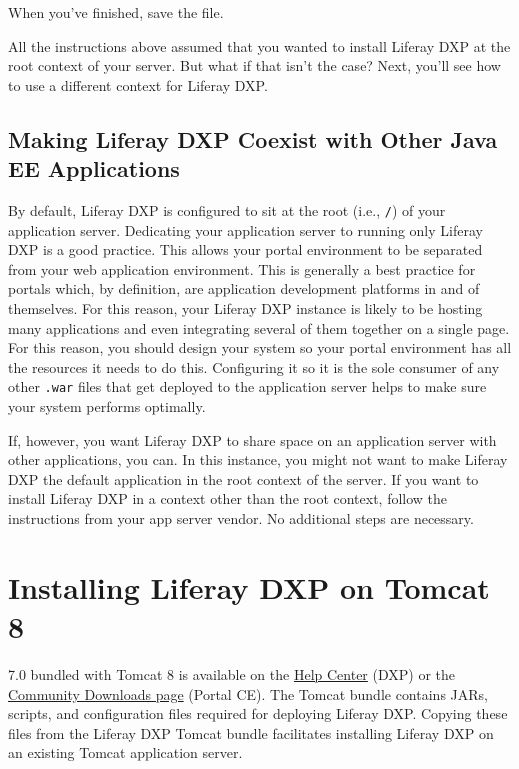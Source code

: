 When you've finished, save the file.

All the instructions above assumed that you wanted to install Liferay
DXP at the root context of your server. But what if that isn't the case?
Next, you'll see how to use a different context for Liferay DXP.

\subsection{Making Liferay DXP Coexist with Other Java EE
Applications}\label{making-liferay-dxp-coexist-with-other-java-ee-applications}

By default, Liferay DXP is configured to sit at the root (i.e.,
\texttt{/}) of your application server. Dedicating your application
server to running only Liferay DXP is a good practice. This allows your
portal environment to be separated from your web application
environment. This is generally a best practice for portals which, by
definition, are application development platforms in and of themselves.
For this reason, your Liferay DXP instance is likely to be hosting many
applications and even integrating several of them together on a single
page. For this reason, you should design your system so your portal
environment has all the resources it needs to do this. Configuring it so
it is the sole consumer of any other \texttt{.war} files that get
deployed to the application server helps to make sure your system
performs optimally.

If, however, you want Liferay DXP to share space on an application
server with other applications, you can. In this instance, you might not
want to make Liferay DXP the default application in the root context of
the server. If you want to install Liferay DXP in a context other than
the root context, follow the instructions from your app server vendor.
No additional steps are necessary.

\section{Installing Liferay DXP on Tomcat
8}\label{installing-liferay-dxp-on-tomcat-8}

7.0 bundled with Tomcat 8 is available on the
\href{https://help.liferay.com/hc}{Help Center} (DXP) or the
\href{https://www.liferay.com/downloads-community}{Community Downloads
page} (Portal CE). The Tomcat bundle contains JARs, scripts, and
configuration files required for deploying Liferay DXP. Copying these
files from the Liferay DXP Tomcat bundle facilitates installing Liferay
DXP on an existing Tomcat application server.


